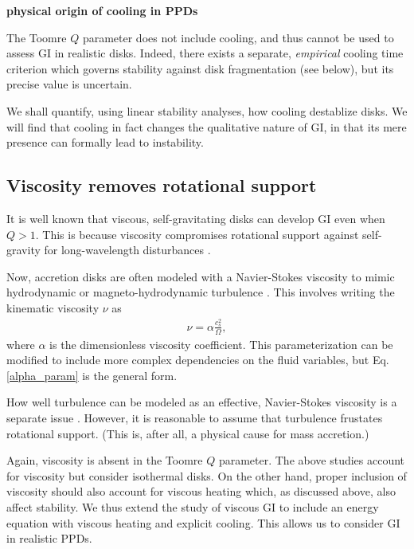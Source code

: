 \documentclass[iop, numberedappendix]{emulateapj}
\begin{document}
{\bf physical origin of cooling in PPDs}


The Toomre $Q$ parameter does not include cooling, and thus cannot be 
used to assess GI in realistic disks. Indeed, there exists a separate, 
\emph{empirical} cooling time criterion which governs stability against disk
fragmentation (see below), but its precise value is uncertain.  

We shall quantify, using linear stability analyses, how cooling 
destablize disks. We will find that cooling in fact changes the 
qualitative nature of GI, in that its mere presence can
formally lead to instability.  

\subsection{Viscosity removes rotational support}
It is well known that viscous, self-gravitating disks can develop 
GI even when $Q>1$. This is because viscosity compromises rotational
support against self-gravity for long-wavelength disturbances
\citep{lynden-bell74,willerding92,gammie96}. %

Now, accretion disks are often modeled with a Navier-Stokes viscosity
to mimic hydrodynamic or magneto-hydrodynamic turbulence
\citep{shakura73}. This involves writing the
kinematic viscosity $\nu$ as  
\begin{align}\label{alpha_param}
  \nu  = \alpha \frac{c_s^2}{\Omega}, %
\end{align}
where $\alpha$ is the dimensionless viscosity
coefficient. This
parameterization can be modified to include more complex dependencies on the
fluid variables, but Eq. \ref{alpha_param} is the general form. 

How well turbulence can be modeled as an effective, Navier-Stokes
viscosity is a separate issue \citep{balbus99}. However, it is 
reasonable to assume that turbulence frustates rotational 
support. (This is, after all, a physical cause for mass accretion.) 

Again, viscosity is absent in the Toomre $Q$ parameter. The above
studies account for viscosity but consider isothermal disks. On the
other hand, proper inclusion of viscosity should also account for
viscous heating which, as discussed above, also affect stability. 
We thus extend the study of viscous GI to 
include an energy equation with viscous heating and explicit
cooling. This allows us to consider GI in realistic PPDs. 
\end{document}

